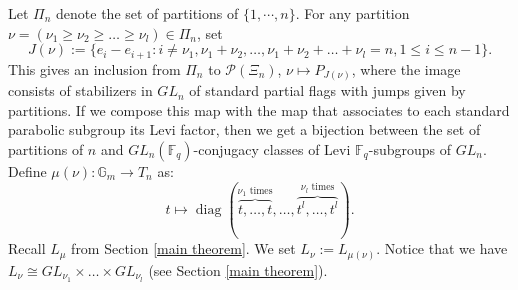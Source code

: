 \documentclass{amsart}
\theoremstyle{plain}
\theoremstyle{definition}
\theoremstyle{remark}
\DeclareMathOperator{\diag}{diag}
\begin{document}
Let $\Pi_{n}$ denote the set of partitions of $\{1,\cdots,n\}$. For any partition
$\nu=(\nu_{1}\geq\nu_{2}\geq\ldots\geq\nu_{l})\in\Pi_n$,
set 
\[
J(\nu):=\{e_{i}-e_{i+1}:i\neq\nu_{1},\nu_{1}+\nu_{2},\ldots,\nu_{1}+\nu_{2}+\ldots+\nu_{l}=n,  1\leq i\leq n-1\}.
\]
This gives an inclusion from $\Pi_{n}$ to $\mathcal{P}(\Xi_{n})$, $\nu\mapsto P_{J(\nu)}$, where the image consists of stabilizers in $GL_{n}$ of standard partial flags with jumps given by partitions. If we compose this map with the map that associates to each standard parabolic subgroup its Levi factor, then we get a bijection between the set of partitions of $n$ and $GL_{n}(\mathbb{F}_{q})$-conjugacy classes of Levi $\mathbb{F}_{q}$-subgroups of $GL_{n}$.
Define $\mu(\nu):\mathbb{G}_{m}\rightarrow T_n$ as:
\[
t\mapsto\diag(\overbrace{t,\ldots,t}^{\nu_{1}\text{ times}},\ldots,\overbrace{t^{l},\ldots,t^{l}}^{\nu_{l}\text{ times}}).
\]
Recall $L_{\mu}$ from Section \ref{main theorem}. We set $L_{\nu}:=L_{\mu(\nu)}$. Notice that we have $L_{\nu}\cong GL_{\nu_{1}}\times\ldots\times GL_{\nu_{l}}$ (see Section \ref{main theorem}).
\end{document}
